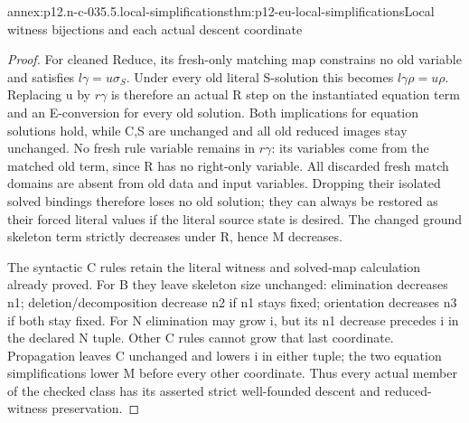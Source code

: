 \begin{annexitem}{annex:p12.n-c-035.5.local-simplifications}{thm:p12-eu-local-simplifications}{Local witness bijections and each actual descent coordinate}
\begin{proof}
For cleaned Reduce, its fresh-only matching map constrains no old
variable and satisfies \(l\gamma=u\sigma_S\). Under every old
literal S-solution this becomes \(l\gamma\rho=u\rho\).
Replacing u by \(r\gamma\) is therefore an actual R step on
the instantiated equation term and an E-conversion for every old
solution. Both implications for equation solutions hold, while
C,S are unchanged and all old reduced images stay unchanged.
No fresh rule variable remains in \(r\gamma\): its variables
come from the matched old term, since R has no right-only variable.
All discarded fresh match domains are absent from old data and
input variables. Dropping their isolated solved bindings therefore
loses no old solution; they can always be restored as their forced
literal values if the literal source state is desired. The changed
ground skeleton term strictly decreases under R, hence M decreases.

The syntactic C rules retain the literal witness and solved-map
calculation already proved. For B they leave skeleton size unchanged:
elimination decreases n1; deletion/decomposition decrease n2 if
n1 stays fixed; orientation decreases n3 if both stay fixed.
For N elimination may grow i, but its n1 decrease precedes i in
the declared N tuple. Other C rules cannot grow that last coordinate.
Propagation leaves C unchanged and lowers i in either tuple; the
two equation simplifications lower M before every other coordinate.
Thus every actual member of the checked class has its asserted
strict well-founded descent and reduced-witness preservation.
\end{proof}
\end{annexitem}

